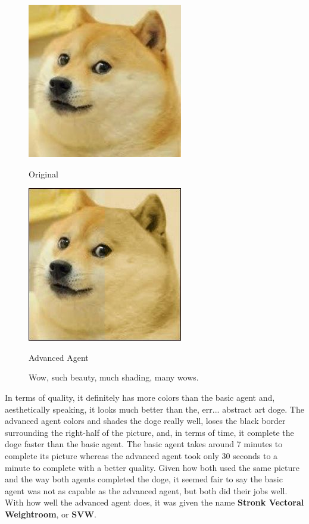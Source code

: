 \documentclass[11pt]{article}
\begin{document}
\begin{figure}[h]
\begin{minipage}[c]{0.5\textwidth}
\centering
\includegraphics[scale=0.94]{images/smolDoge.jpg}
\begin{center}
Original
\end{center}
\end{minipage}
\begin{minipage}[c]{0.5\textwidth}
\centering
\includegraphics[scale=0.70]{images/advanced.jpg}
\begin{center}
Advanced Agent
\end{center}
\end{minipage}
\caption{Wow, such beauty, much shading, many wows.}
\end{figure}

In terms of quality, it definitely has more colors than the basic agent and, aesthetically speaking, it looks much better than the, err... abstract art doge. The advanced agent colors and shades the doge really well, loses the black border surrounding the right-half of the picture, and, in terms of time, it complete the doge faster than the basic agent. The basic agent takes around 7 minutes to complete its picture whereas the advanced agent took only 30 seconds to a minute to complete with a better quality. Given how both used the same picture and the way both agents completed the doge, it seemed fair to say the basic agent was not as capable as the advanced agent, but both did their jobs well. With how well the advanced agent does, it was given the name \textbf{Stronk Vectoral Weightroom}, or \textbf{SVW}.
\end{document}
